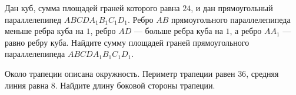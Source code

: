 \begin{class}[number=3]
\begin{listofex}
		\item Дан куб, сумма площадей граней которого равна \( 24 \), и дан прямоугольный
		параллелепипед \( ABCDA_1B_1C_1D_1 \). Ребро \( AB \) прямоугольного
		параллелепипеда меньше ребра куба на \( 1 \), ребро \( AD \) --- больше ребра куба
		на \( 1 \), а ребро \( AA_1 \) --- равно ребру куба. Найдите сумму площадей граней
		прямоугольного параллелепипеда \( ABCDA_1B_1C_1D_1 \).
		\item Около трапеции описана окружность. Периметр трапеции равен \( 36 \),
		средняя линия равна \( 8 \). Найдите длину боковой стороны трапеции.
	\end{listofex}
\end{class}
%
%
%
%
%
%
